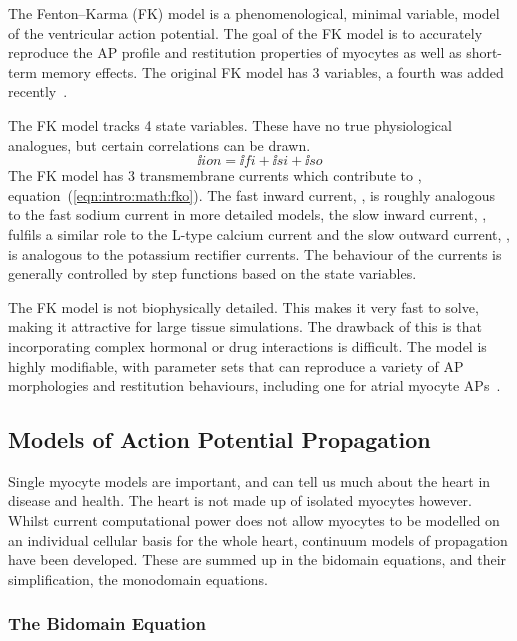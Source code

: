 The Fenton--Karma (FK) model is a
phenomenological, minimal variable, model of the ventricular action
potential.
The goal of the FK model is to accurately reproduce the AP profile and
restitution properties of myocytes as well as short-term memory effects.
The original FK model has 3 variables, a fourth was added
recently~\cite{Fenton1998,Bueno-Orovio2008}.

The FK model tracks 4 state variables.
These have no true physiological analogues, but certain correlations can be
drawn.
\begin{equation}
\label{eqn:intro:math:fko}
\ii{ion} = \ii{fi} + \ii{si} + \ii{so}
\end{equation}
The FK model has 3 transmembrane currents which contribute to ,
equation~(\ref{eqn:intro:math:fko}).
The fast inward current, , is roughly analogous to the fast sodium
current in more detailed models, the slow inward current, , fulfils a
similar role to the L-type calcium current and the slow outward current, ,
is analogous to the potassium rectifier currents.
The behaviour of the currents is generally controlled by step functions based
on the state variables.

The FK model is not biophysically detailed.
This makes it very fast to solve, making it attractive for large tissue
simulations.
The drawback of this is that incorporating complex hormonal or drug interactions
is difficult.
The model is highly modifiable, with parameter sets that can reproduce a variety
of AP morphologies and restitution behaviours, including one for atrial myocyte
APs~\cite{Weber2008}.

\subsection{Models of Action Potential Propagation}

Single myocyte models are important, and can tell us much about the heart in
disease and health.
The heart is not made up of isolated myocytes however.
Whilst current computational power does not allow myocytes to be modelled on an
individual cellular basis for the whole heart, continuum models of propagation
have been developed.
These are summed up in the bidomain equations, and their simplification, the
monodomain equations.

\subsubsection{The Bidomain Equation}

